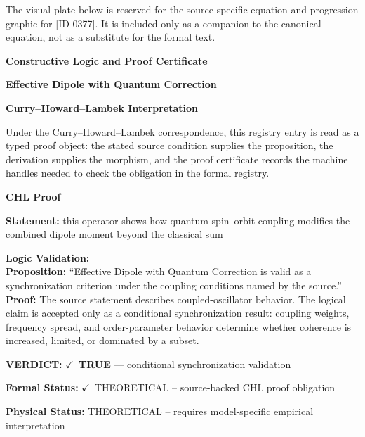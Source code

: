 \begingroup\footnotesize\sloppy
The visual plate below is reserved for the source-specific equation and progression graphic for [ID 0377]. It is included only as a companion to the canonical equation, not as a substitute for the formal text.
\par\endgroup
\ifTZPDarkEdition
{}
\fi

\clearpage
\begingroup\tzpsupportsetup
\noindent\textbf{\fontsize{10.8pt}{12.8pt}\selectfont [ID 0377] Constructive Logic and Proof Certificate}\par
\noindent\textbf{\fontsize{10pt}{12pt}\selectfont Effective Dipole with Quantum Correction}\par
\vspace{0.45em}
\begingroup
\footnotesize
\setlength{\parskip}{0.22em}
\setlength{\parindent}{0pt}
\noindent\textbf{Curry--Howard--Lambek Interpretation}\par
Under the Curry--Howard--Lambek correspondence, this registry entry is read as a typed proof
object: the stated source condition supplies the proposition, the derivation supplies the
morphism, and the proof certificate records the machine handles needed to check the obligation
in the formal registry.

\vspace{0.45em}
\noindent\textbf{CHL Proof}\par
\textbf{Statement:} this operator shows how quantum spin--orbit coupling modifies the combined dipole moment
beyond the classical sum

\textbf{Logic Validation:}\\
\textbf{Proposition:} ``Effective Dipole with Quantum Correction is valid as a synchronization criterion under
the coupling conditions named by the source.''\\
\textbf{Proof:} The source statement describes coupled-oscillator behavior. The logical claim is
accepted only as a conditional synchronization result: coupling weights, frequency
spread, and order-parameter behavior determine whether coherence is increased, limited,
or dominated by a subset.

\textbf{VERDICT:} \ensuremath{\checkmark}\ \textbf{TRUE} --- conditional synchronization validation

\textbf{Formal Status:} \ensuremath{\checkmark}\ THEORETICAL -- source-backed CHL proof obligation

\textbf{Physical Status:} THEORETICAL -- requires model-specific empirical interpretation
\par\vspace{0.45em}
\par
\ifTZPDarkEdition
{}
\fi
\endgroup
\endgroup
